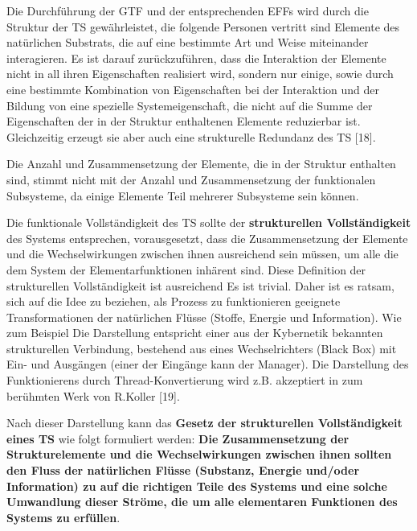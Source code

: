 \documentclass[11pt,a4paper]{article}
\begin{document}
Die Durchführung der GTF und der entsprechenden EFFs wird durch die Struktur
der TS gewährleistet, die folgende Personen vertritt sind Elemente des
natürlichen Substrats, die auf eine bestimmte Art und Weise miteinander
interagieren.  Es ist darauf zurückzuführen, dass die Interaktion der Elemente
nicht in all ihren Eigenschaften realisiert wird, sondern nur einige, sowie
durch eine bestimmte Kombination von Eigenschaften bei der Interaktion und der
Bildung von eine spezielle Systemeigenschaft, die nicht auf die Summe der
Eigenschaften der in der Struktur enthaltenen Elemente reduzierbar ist.
Gleichzeitig erzeugt sie aber auch eine strukturelle Redundanz des TS [18].

Die Anzahl und Zusammensetzung der Elemente, die in der Struktur enthalten
sind, stimmt nicht mit der Anzahl und Zusammensetzung der funktionalen
Subsysteme, da einige Elemente Teil mehrerer Subsysteme sein können.

Die funktionale Vollständigkeit des TS sollte der \textbf{strukturellen
  Vollständigkeit} des Systems entsprechen, vorausgesetzt, dass die
Zusammensetzung der Elemente und die Wechselwirkungen zwischen ihnen
ausreichend sein müssen, um alle die dem System der Elementarfunktionen
inhärent sind. Diese Definition der strukturellen Vollständigkeit ist
ausreichend Es ist trivial. Daher ist es ratsam, sich auf die Idee zu
beziehen, als Prozess zu funktionieren geeignete Transformationen der
natürlichen Flüsse (Stoffe, Energie und Information). Wie zum Beispiel Die
Darstellung entspricht einer aus der Kybernetik bekannten strukturellen
Verbindung, bestehend aus eines Wechselrichters (Black Box) mit Ein- und
Ausgängen (einer der Eingänge kann der Manager). Die Darstellung des
Funktionierens durch Thread-Konvertierung wird z.B. akzeptiert in zum
berühmten Werk von R.Koller [19].

Nach dieser Darstellung kann das \textbf{Gesetz der strukturellen
  Vollständigkeit eines TS} wie folgt formuliert werden: \textbf{Die
  Zusammensetzung der Strukturelemente und die Wechselwirkungen zwischen ihnen
  sollten den Fluss der natürlichen Flüsse (Substanz, Energie und/oder
  Information) zu auf die richtigen Teile des Systems und eine solche
  Umwandlung dieser Ströme, die um alle elementaren Funktionen des Systems zu
  erfüllen}.
\end{document}
